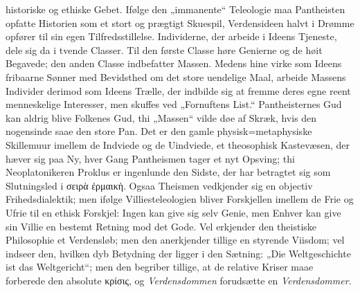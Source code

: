 \documentclass[12pt]{book}
\begin{document}
historiske og ethiske Gebet. Ifølge den „immanente“ Teleologie maa Pantheisten opfatte
Historien som et stort og prægtigt Skuespil, Verdensideen halvt i Drømme opfører til sin
egen Tilfredsstillelse. Individerne, der arbeide i Ideens Tjeneste, dele sig da i tvende
Classer. Til den første Classe høre Genierne og de høit Begavede; den anden Classe
indbefatter Massen. Medens hine virke som Ideens fribaarne Sønner med Bevidsthed om det
store uendelige Maal, arbeide Massens Individer derimod som Ideens Trælle, der indbilde
sig at fremme deres egne reent menneskelige Interesser, men skuffes ved „Fornuftens
List.“ Pantheisternes Gud kan aldrig blive Folkenes Gud, thi „Massen“ vilde døe af
Skræk, hvis den nogensinde saae den store Pan. Det er den gamle
physisk=metaphysiske Skillemuur imellem de Indviede og de Uindviede, et theosophisk
Kastevæsen, der hæver sig paa Ny, hver Gang Pantheismen tager et nyt Opsving; thi
Neoplatonikeren Proklus er ingenlunde den Sidste, der har betragtet sig som
Slutningsled i σειρὰ ἐρμαικὴ. Ogsaa Theismen vedkjender sig en objectiv
Frihedsdialektik; men ifølge Villiesteleologien bliver Forskjellen imellem de Frie og
Ufrie til en ethisk Forskjel: Ingen kan give sig selv Genie, men Enhver kan give sin
Villie en bestemt Retning mod det Gode. Vel erkjender den theistiske Philosophie et
Verdensløb; men den anerkjender tillige en styrende Viisdom; vel indseer den, hvilken
dyb Betydning der ligger i den Sætning: „Die Weltgeschichte ist das Weltgericht“; men
den begriber tillige, at de relative Kriser maae forberede den absolute κρίσις, og
\emph{Verdensdommen} forudsætte en \emph{Verdensdommer}.
\end{document}

